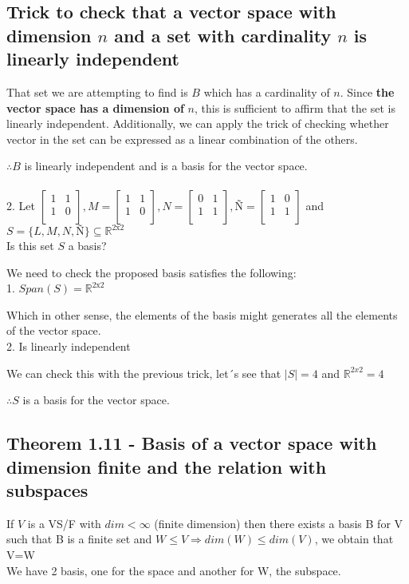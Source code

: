 \documentclass{article}
\begin{document}
\subsection*{Trick to check that a vector space with dimension \(n\) and a set with cardinality \(n\) is linearly independent}

That set we are attempting to find is \(B\) which has a cardinality of \(n\). Since \textbf{the vector space has a dimension of }\(n\), this is sufficient to affirm that the set is linearly independent. Additionally, we can apply the trick of checking whether vector in the set can be expressed as a linear combination of the others.

\(\therefore B\) is linearly independent and is a basis for the vector space.
\\
\\
2. Let \(\begin{bmatrix}
    1 & 1\\
    1 & 0\\
\end{bmatrix}, M = \begin{bmatrix}
    1 & 1\\
    1 & 0\\
\end{bmatrix}, N = \begin{bmatrix}
    0 & 1\\
    1 & 1\\
\end{bmatrix}, Ñ = \begin{bmatrix}
    1 & 0\\
    1 & 1\\
\end{bmatrix}\) 
and \(S = \{ L,M,N,Ñ \} \subseteq \mathbb{R}^{2\text{x}2}\)
\\

Is this set \(S\) a basis?

We need to check the proposed basis satisfies the following:
\\

1. \(Span(S) = \mathbb{R}^{2 \text{x} 2}\)

Which in other sense, the elements of the basis might generates all the elements of the vector space.
\\

2. Is linearly independent

We can check this with the previous trick, let´s see that \(|S| = 4\) and \(\mathbb{R}^{2x2} = 4\)

\(\therefore S\) is a basis for the vector space.

\subsection*{Theorem 1.11 - Basis of a vector space with dimension finite and the relation with subspaces}
If \(V\) is a VS/F with \(dim<\infty\) (finite dimension) then there exists a basis B for V such that B is a finite set and \(W\leq V \Rightarrow dim (W) \leq dim(V)\), we obtain that V=W
\\

We have 2 basis, one for the space and another for W, the subspace.
\end{document}
